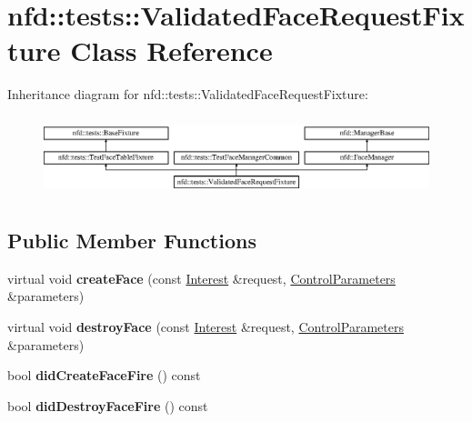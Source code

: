\hypertarget{classnfd_1_1tests_1_1ValidatedFaceRequestFixture}{}\section{nfd\+:\+:tests\+:\+:Validated\+Face\+Request\+Fixture Class Reference}
\label{classnfd_1_1tests_1_1ValidatedFaceRequestFixture}
Inheritance diagram for nfd\+:\+:tests\+:\+:Validated\+Face\+Request\+Fixture\+:\begin{figure}[H]
\begin{center}
\leavevmode
\includegraphics[height=2.333333cm]{classnfd_1_1tests_1_1ValidatedFaceRequestFixture}
\end{center}
\end{figure}
\subsection*{Public Member Functions}
\begin{DoxyCompactItemize}
\item 
virtual void {\bfseries create\+Face} (const \hyperlink{classndn_1_1Interest}{Interest} \&request, \hyperlink{classndn_1_1nfd_1_1ControlParameters}{Control\+Parameters} \&parameters)\hypertarget{classnfd_1_1tests_1_1ValidatedFaceRequestFixture_a183b3bef41466ece8f3cae582ad20e54}{}\label{classnfd_1_1tests_1_1ValidatedFaceRequestFixture_a183b3bef41466ece8f3cae582ad20e54}

\item 
virtual void {\bfseries destroy\+Face} (const \hyperlink{classndn_1_1Interest}{Interest} \&request, \hyperlink{classndn_1_1nfd_1_1ControlParameters}{Control\+Parameters} \&parameters)\hypertarget{classnfd_1_1tests_1_1ValidatedFaceRequestFixture_ad81face8c1d4cd958800ac582b525340}{}\label{classnfd_1_1tests_1_1ValidatedFaceRequestFixture_ad81face8c1d4cd958800ac582b525340}

\item 
bool {\bfseries did\+Create\+Face\+Fire} () const\hypertarget{classnfd_1_1tests_1_1ValidatedFaceRequestFixture_a87005c23959571f1c6ba43557e649a8e}{}\label{classnfd_1_1tests_1_1ValidatedFaceRequestFixture_a87005c23959571f1c6ba43557e649a8e}

\item 
bool {\bfseries did\+Destroy\+Face\+Fire} () const\hypertarget{classnfd_1_1tests_1_1ValidatedFaceRequestFixture_a580cb0eb746bbb7df6dfb817aab9540f}{}\label{classnfd_1_1tests_1_1ValidatedFaceRequestFixture_a580cb0eb746bbb7df6dfb817aab9540f}

\end{DoxyCompactItemize}
